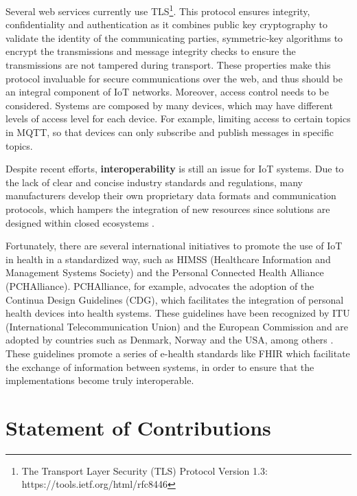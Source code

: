Several web services currently use \acf{TLS}\footnote{The Transport Layer Security (TLS) Protocol Version 1.3: https://tools.ietf.org/html/rfc8446}. This protocol ensures integrity, confidentiality and authentication as it combines public key cryptography to validate the identity of the communicating parties, symmetric-key algorithms to encrypt the transmissions and message integrity checks to ensure the transmissions are not tampered during transport. These properties make this protocol invaluable for secure communications over the web, and thus should be an integral component of \acs{IoT} networks. Moreover, access control needs to be considered. Systems are composed by many devices, which may have different levels of access level for each device. For example, limiting access to certain topics in \acs{MQTT}, so that devices can only subscribe and publish messages in specific topics.      

Despite recent efforts, \textbf{interoperability} is still an issue for \acs{IoT} systems. Due to the lack of clear and concise industry standards and regulations, many manufacturers develop their own proprietary data formats and communication protocols, which hampers the integration of new resources since solutions are designed within closed ecosystems \cite{Rubi2019}. \bigskip

Fortunately, there are several international initiatives to promote the use of \acs{IoT} in health in a standardized way, such as HIMSS (Healthcare Information and Management Systems Society) and the Personal Connected Health Alliance (PCHAlliance). PCHAlliance, for example, advocates the adoption of the Continua Design Guidelines (CDG), which facilitates the integration of personal health devices into health systems. These guidelines have been recognized by ITU (International Telecommunication Union) and the European Commission and are adopted by countries such as Denmark, Norway and the USA, among others \cite{PersonalConnectedHealthAlliance2017}. These guidelines promote a series of e-health standards like \acs{FHIR} which facilitate the exchange of information between systems, in order to ensure that the implementations become truly interoperable.

\section{Statement of Contributions}

